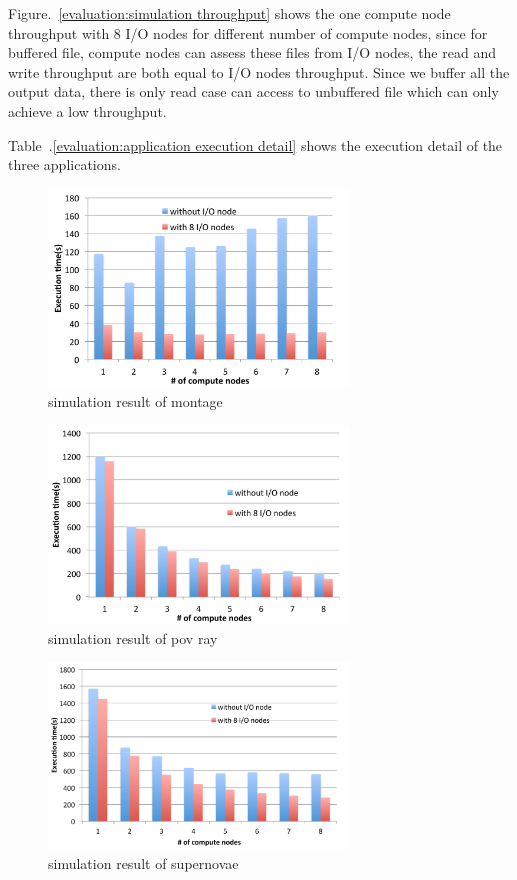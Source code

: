 Figure.~\ref{evaluation:simulation throughput} shows the one compute node throughput with 8 I/O
nodes for different number of compute nodes, since for buffered file, compute nodes can assess these
files from I/O nodes, the read and write throughput are both equal to I/O nodes throughput.
Since we buffer all the output data, there is only read case can access to unbuffered file which
can only achieve a low throughput.

Table~.\ref{evaluation:application execution detail} shows the execution detail of the three
applications.


\begin{figure}
\centering
\includegraphics[width=8cm]{img/simulation_montage}
\caption{simulation result of montage}
\label{evaluation:simulation result montage}
\end{figure}


\begin{figure}
\centering
\includegraphics[width=8cm]{img/simulation_povray}
\caption{simulation result of pov ray}
\label{evaluation:simulation result pov ray}
\end{figure}

\begin{figure}
\centering
\includegraphics[width=8cm]{img/simulation_supernovae}
\caption{simulation result of supernovae}
\label{evaluation:simulation result supernovae}
\end{figure}

